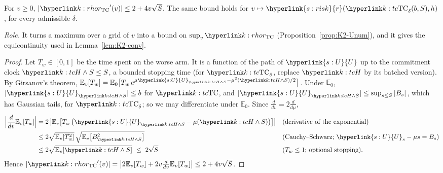 \documentclass[11pt]{article}
\DeclareRobustCommand{\sy}[2]{{\hyperlink{#1}{#2}}}
\newcommand{\E}{\mathbb{E}}
\newcommand{\1}{\mathbf{1}}
\newcommand{\rk}{\sy{s:risk}{r}}
\newcommand{\Ud}{\sy{s:U}{U}}
\begin{document}
\begin{lemma}[Lipschitz in $v$]\label{lem:K2-lip}
For $v\ge0$, $|\kr'(v)|\le2+4v\sqrt S$. The same bound holds for $v\mapsto\rk(\kTC_\delta(b,S),h)$, for every admissible $\delta$.
\end{lemma}
\noindent\textit{Role.} It turns a maximum over a grid of $v$ into a bound on $\sup_v\kr$ (Proposition~\ref{prop:K2-Unum}), and it gives the equicontinuity used in
Lemma~\ref{lem:K2-conv}.
\begin{proof}
Let $T_w\in[0,1]$ be the time spent on the worse arm. It is a function of the path of $\Ud$ up to the commitment clock $\kH\wedge S\le S$, a bounded stopping time
(for $\kTC_\delta$, replace $\kH$ by its batched version). By Girsanov's theorem, $\E_v[T_w]=\E_0\big[T_w\,e^{\mu\Ud_{\kH\wedge S}-\mu^2(\kH\wedge S)/2}\big]$. Under $\E_0$,
$|\Ud_{\kH\wedge S}|\le b$ for $\kTC$, and $|\Ud_{\kH\wedge S}|\le\sup_{s\le S}|B_s|$, which has Gaussian tails, for $\kTC_\delta$; so we may differentiate under $\E_0$.
Since $\frac d{dv}=2\frac d{d\mu}$,
\begin{align*}
\Big|\frac{d}{dv}\E_v[T_w]\Big|
&=2\,\big|\E_v\big[T_w\,\big(\Ud_{\kH\wedge S}-\mu(\kH\wedge S)\big)\big]\big| && \text{(derivative of the exponential)}\\
&\le2\sqrt{\E_v[T_w^2]}\,\sqrt{\E_v\big[B_{\kH\wedge S}^2\big]} && \text{(Cauchy--Schwarz; $\Ud_s-\mu s=B_s$)}\\
&\le2\sqrt{\E_v[\kH\wedge S]}\ \le\ 2\sqrt S && \text{($T_w\le1$; optional stopping)}.
\end{align*}
Hence $|\kr'(v)|=\big|2\E_v[T_w]+2v\frac d{dv}\E_v[T_w]\big|\le2+4v\sqrt S$.
\end{proof}
\end{document}
